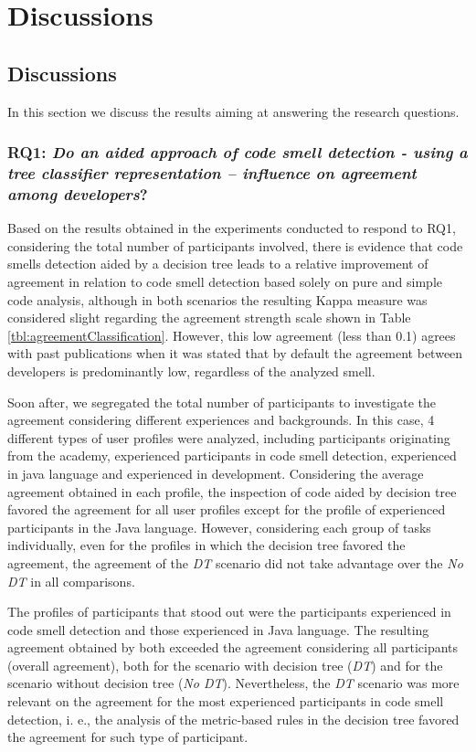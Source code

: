 \chapter{Discussions}

\section{Discussions}
\label{sec:discussions}

In this section we discuss the results aiming at answering the research questions. 

\subsection{\textbf{RQ1}: \textit{Do an aided approach of code smell detection - using a tree classifier representation – influence on agreement among developers}?}
Based on the results obtained in the experiments conducted to respond to RQ1, considering the total number of participants involved, there is evidence that code smells detection aided by a decision tree leads to a relative improvement of agreement in relation to code smell detection based solely on pure and simple code analysis, although in both scenarios the resulting Kappa measure was considered slight regarding the agreement strength scale shown in Table \ref{tbl:agreementClassification}. However, this low agreement (less than 0.1) agrees with past publications \cite{hozano2018you} when it was stated that by default the agreement between developers is predominantly low, regardless of the analyzed smell.

Soon after, we segregated the total number of participants to investigate the agreement considering different experiences and backgrounds. In this case, 4 different types of user profiles were analyzed, including participants originating from the academy, experienced participants in code smell detection, experienced in java language and experienced in development. Considering the average agreement obtained in each profile, the inspection of code aided by decision tree favored the agreement for all user profiles except for the profile of experienced participants in the Java language. However, considering each group of tasks individually, even for the profiles in which the decision tree favored the agreement, the agreement of the \textit{DT} scenario did not take advantage over the \textit{No DT} in all comparisons.

The profiles of participants that stood out were the participants experienced in code smell detection and those experienced in Java language. The resulting agreement obtained by both exceeded the agreement considering all participants (overall agreement), both for the scenario with decision tree (\textit{DT}) and for the scenario without decision tree (\textit{No DT}). Nevertheless, the \textit{DT} scenario was more relevant on the agreement for the most experienced participants in code smell detection, i. e., the analysis of the metric-based rules in the decision tree favored the agreement for such type of participant.

